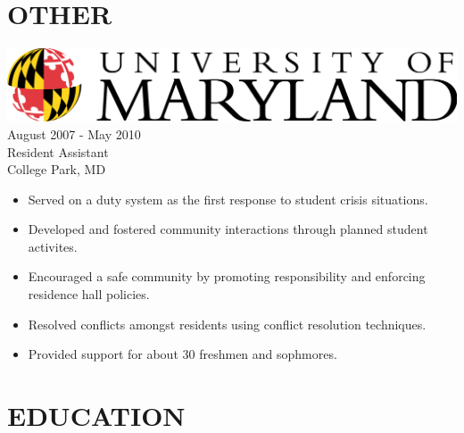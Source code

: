 \documentclass[12pt, line, margin]{res}
\begin{document}
\begin{resume}
\section{OTHER} {\sl \includegraphics[scale=0.07]{resume_images/UMD_primary[Converted].png}} \hfill August 2007 - May 2010 \\
                Resident Assistant \\
                College Park, MD
                 \begin{itemize}  \itemsep -2pt %
                 \item   Served on a duty system as the first response to student crisis situations.
                 \item   Developed and fostered community interactions through planned student activites.
	       \item   Encouraged a safe community by promoting responsibility and enforcing residence hall policies.
	       \item   Resolved conflicts amongst residents using conflict resolution \newline
                               techniques.
	       \item   Provided support for about 30 freshmen and sophmores.
                \end{itemize}

\section{EDUCATION}


\end{resume}
\end{document}
